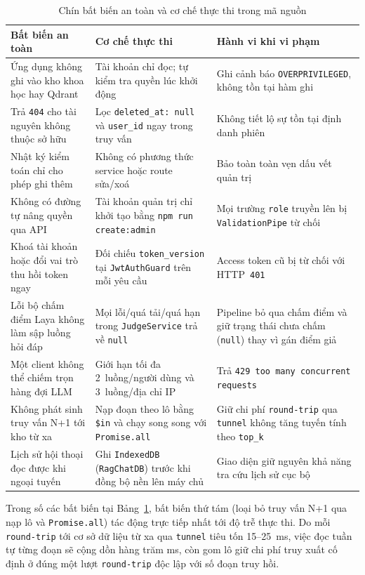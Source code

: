 \begin{table}[htbp]
\centering
\caption{Chín bất biến an toàn và cơ chế thực thi trong mã nguồn}
\label{tab:chin-bat-bien-an-toan}
\footnotesize
\setlength{\tabcolsep}{4pt}
\begin{tabularx}{\textwidth}{
  >{\raggedright\arraybackslash}p{4.3cm}
  >{\raggedright\arraybackslash}p{5.2cm}
  >{\raggedright\arraybackslash}X
}
\toprule
\textbf{Bất biến an toàn} & \textbf{Cơ chế thực thi} & \textbf{Hành vi khi vi phạm} \\
\midrule
Ứng dụng không ghi vào kho khoa học hay Qdrant & Tài khoản chỉ đọc; tự kiểm tra quyền lúc khởi động & Ghi cảnh báo \texttt{OVERPRIVILEGED}, không tồn tại hàm ghi \\
\midrule
Trả \texttt{404} cho tài nguyên không thuộc sở hữu & Lọc \texttt{deleted\_at:\allowbreak{} null} và \texttt{user\_id} ngay trong truy vấn & Không tiết lộ sự tồn tại định danh phiên \\
\midrule
Nhật ký kiểm toán chỉ cho phép ghi thêm & Không có phương thức service hoặc route sửa/xoá & Bảo toàn toàn vẹn dấu vết quản trị \\
\midrule
Không có đường tự nâng quyền qua API & Tài khoản quản trị chỉ khởi tạo bằng \texttt{npm run create:admin} & Mọi trường \texttt{role} truyền lên bị \texttt{ValidationPipe} từ chối \\
\midrule
Khoá tài khoản hoặc đổi vai trò thu hồi token ngay & Đối chiếu \texttt{token\_version} tại \texttt{JwtAuthGuard} trên mỗi yêu cầu & Access token cũ bị từ chối với HTTP~\texttt{401} \\
\midrule
Lỗi bộ chấm điểm Laya không làm sập luồng hỏi đáp & Mọi lỗi/quá tải/quá hạn trong \texttt{JudgeService} trả về \texttt{null} & Pipeline bỏ qua chấm điểm và giữ trạng thái chưa chấm (\texttt{null}) thay vì gán điểm giả \\
\midrule
Một client không thể chiếm trọn hàng đợi LLM & Giới hạn tối đa 2~luồng/người dùng và 3~luồng/địa chỉ IP & Trả \texttt{429 too many concurrent requests} \\
\midrule
Không phát sinh truy vấn N+1 tới kho từ xa & Nạp đoạn theo lô bằng \texttt{\$in} và chạy song song với \texttt{Promise.all} & Giữ chi phí \texttt{round-trip} qua \texttt{tunnel} không tăng tuyến tính theo \texttt{top\_k} \\
\midrule
Lịch sử hội thoại đọc được khi ngoại tuyến & Ghi \texttt{IndexedDB} (\texttt{RagChatDB}) trước khi đồng bộ nền lên máy chủ & Giao diện giữ nguyên khả năng tra cứu lịch sử cục bộ \\
\bottomrule
\end{tabularx}
\end{table}

Trong số các bất biến tại Bảng~\ref{tab:chin-bat-bien-an-toan}, bất biến thứ tám (loại bỏ truy vấn N+1 qua nạp lô và \texttt{Promise.all}) tác động trực tiếp nhất tới độ trễ thực thi. Do mỗi \texttt{round-trip} tới cơ sở dữ liệu từ xa qua \texttt{tunnel} tiêu tốn 15--25~ms, việc đọc tuần tự từng đoạn sẽ cộng dồn hàng trăm ms, còn gom lô giữ chi phí truy xuất cố định ở đúng một lượt \texttt{round-trip} độc lập với số đoạn truy hồi.
